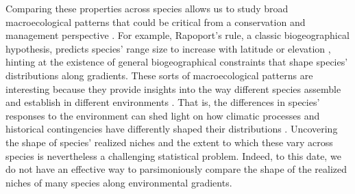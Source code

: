 \documentclass[11pt, a4paper]{article}
\begin{document}
Comparing these properties across species allows us to study broad macroecological patterns that could be critical from a conservation and management perspective \citep{stevensElevationalGradientAltitudinal1992, channellDynamicBiogeographyConservation2000}. For example, Rapoport's rule, a classic biogeographical hypothesis, predicts species' range size to increase with latitude or elevation \citep{stevensElevationalGradientAltitudinal1992}, hinting at the existence of general biogeographical constraints that shape species' distributions along gradients. These sorts of macroecological patterns are interesting because they provide insights into the way different species assemble and establish in different environments \citep{linderGeographicRangeStructure2000}. That is, the differences in species' responses to the environment can shed light on how climatic processes and historical contingencies have differently shaped their distributions \citep{rohdeLatitudinalGradientsSpecies1992, helmuthBIOPHYSICSPHYSIOLOGICALECOLOGY2004, siefertHowClimateDispersal2015}. Uncovering the shape of species' realized niches and the extent to which these vary across species is nevertheless a challenging statistical problem. Indeed, to this date, we do not have an effective way to parsimoniously compare the shape of the realized niches of many species along environmental gradients.
\end{document}
